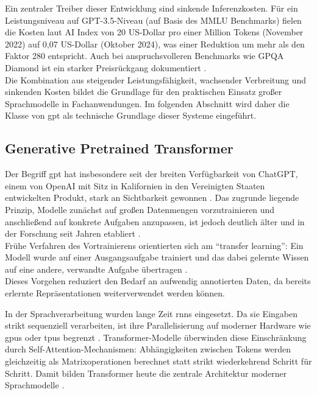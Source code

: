 Ein zentraler Treiber dieser Entwicklung sind sinkende Inferenzkosten.
Für ein Leistungsniveau auf GPT-3.5-Niveau (auf Basis des MMLU Benchmarks) fielen die Kosten laut AI Index von 20 US-Dollar pro einer Million Tokens (November 2022) auf 0{,}07 US-Dollar (Oktober 2024), was einer Reduktion um mehr als den Faktor 280 entspricht.
Auch bei anspruchsvolleren Benchmarks wie GPQA Diamond ist ein starker Preisrückgang dokumentiert \cite[Abb. 1.3.22]{maslej2025artificialintelligenceindexreport}. \\

Die Kombination aus steigender Leistungsfähigkeit, wachsender Verbreitung und sinkenden Kosten bildet die Grundlage für den praktischen Einsatz großer Sprachmodelle in Fachanwendungen.
Im folgenden Abschnitt wird daher die Klasse von \gls{gpt} als technische Grundlage dieser Systeme eingeführt.

\subsection{Generative Pretrained Transformer}
\label{sec:gpt}

Der Begriff \gls{gpt} hat insbesondere seit der breiten Verfügbarkeit von ChatGPT, einem von OpenAI mit Sitz in Kalifornien in den Vereinigten Staaten entwickelten Produkt, stark an Sichtbarkeit gewonnen \cite{openAi2022chatgpt}. 
Das zugrunde liegende Prinzip, Modelle zunächst auf großen Datenmengen vorzutrainieren und anschließend auf konkrete Aufgaben anzupassen, ist jedoch deutlich älter und in der Forschung seit Jahren etabliert \cite[S. 4-5]{han2021pretrainedmodelspastpresent}. \\

Frühe Verfahren des Vortrainierens orientierten sich am \enquote{transfer learning}: Ein Modell wurde auf einer Ausgangsaufgabe trainiert und das dabei gelernte Wissen auf eine andere, verwandte Aufgabe übertragen \cite[S. 5]{han2021pretrainedmodelspastpresent}. \\
Dieses Vorgehen reduziert den Bedarf an aufwendig annotierten Daten, da bereits erlernte Repräsentationen weiterverwendet werden können.

In der Sprachverarbeitung wurden lange Zeit \gls{rnns} eingesetzt. Da sie Eingaben strikt sequenziell verarbeiten, ist ihre Parallelisierung auf moderner Hardware wie \glspl{gpu} oder \glspl{tpu} begrenzt \cite[S. 7-8]{han2021pretrainedmodelspastpresent}. 
Transformer-Modelle überwinden diese Einschränkung durch Self-Attention-Mechanismen: Abhängigkeiten zwischen Tokens werden gleichzeitig als Matrixoperationen berechnet statt strikt wiederkehrend Schritt für Schritt. 
Damit bilden Transformer heute die zentrale Architektur moderner Sprachmodelle \cite[S. 8-9]{han2021pretrainedmodelspastpresent}. \\

